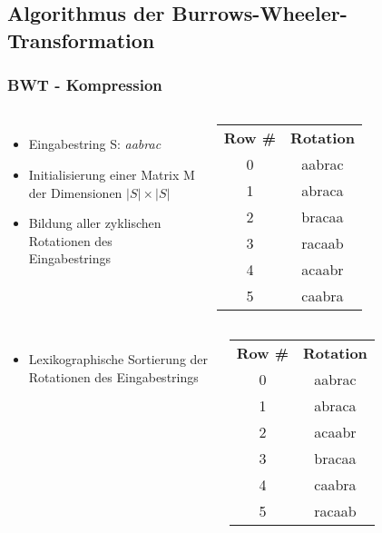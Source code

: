 \documentclass[14pt,xcolor=dvipsnames,pdftex]{beamer}
\begin{document}
\subsection{Algorithmus der Burrows-Wheeler-Transformation}
\begin{frame}[allowframebreaks]
 \frametitle{BWT - Kompression}
    \begin{columns}[c,onlytextwidth]
    \begin{itemize}
	\item Eingabestring S: \textit{aabrac}
	\item Initialisierung einer Matrix M der Dimensionen $|S| \times |S|$
	\item Bildung aller zyklischen Rotationen des Eingabestrings
    \end{itemize}
    \begin{tabular}{c|c}
    \textbf{Row \#} & \textbf{Rotation} \\
    0 & aabrac \\
    1 & abraca \\
    2 & bracaa \\
    3 & racaab \\
    4 & acaabr \\
    5 & caabra \\
    \end{tabular}
    \end{columns}
\framebreak
\begin{columns}[c,onlytextwidth]
 \begin{itemize}
  \item Lexikographische Sortierung der Rotationen des Eingabestrings
 \end{itemize}
    \begin{tabular}{c|c}
    \textbf{Row \#} & \textbf{Rotation} \\
    0 & aabrac \\
    1 & abraca \\
    2 & acaabr \\
    3 & bracaa \\
    4 & caabra \\
    5 & racaab \\
    \end{tabular}
\end{columns}
\framebreak
\begin{columns}[c,onlytextwidth]

\end{columns}
\end{frame}
\end{document}
